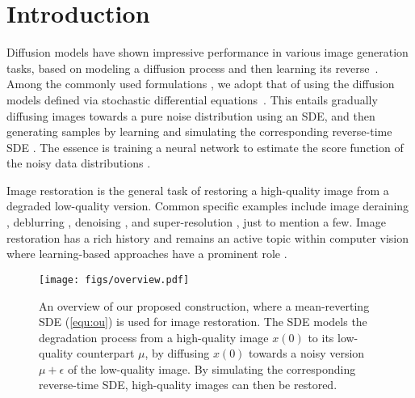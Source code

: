\documentclass{article}
\theoremstyle{plain}
\theoremstyle{definition}
\theoremstyle{remark}
\begin{document}
\section{Introduction}
\label{section:introduction}

Diffusion models have shown impressive performance in various image generation tasks, based on modeling a diffusion process and then learning its reverse~\citep{sohl2015deep, ho2020denoising, song2019generative, song2020improved, song2021denoising, song2021maximum, song2021score, rombach2022high,rissanen2022generative}. Among the commonly used formulations \citep{yang2022diffusion}, we adopt that of using the diffusion models defined via stochastic differential equations~\citep[SDEs,][]{song2021maximum,song2021score}. This entails gradually diffusing images towards a pure noise distribution using an SDE, and then generating samples by learning and simulating the corresponding reverse-time SDE \citep{anderson1982reverse}. The essence is training a neural network to estimate the score function of the noisy data distributions \citep{song2019generative}.

Image restoration is the general task of restoring a high-quality image from a degraded low-quality version. Common specific examples include image deraining \citep{li2019single, ren2019progressive}, deblurring \citep{nah2017deep, zhang2020deblurring}, denoising \citep{zhang2017beyond, zhang2018ffdnet}, and super-resolution \citep{dong2015image, lugmayr2020srflow,luo2022deep}, just to mention a few.
Image restoration has a rich history \citep{hunt1973application, andrews1974digital, sezan1990survey, banham1997digital} and remains an active topic within computer vision where learning-based approaches have a prominent role \citep{zhang2017image, zhang2017learning, wang2022uformer, xiao2022stochastic}. 

\begin{figure*}[t]
    \begin{center}
    \centerline{\texttt{[image: figs/overview.pdf]}}\vspace{-2.0mm}
    \caption{An overview of our proposed construction, where a mean-reverting SDE (\ref{equ:ou}) is used for image restoration. The SDE models the degradation process from a high-quality image $x(0)$ to its low-quality counterpart $\mu$, by diffusing $x(0)$ towards a noisy version $\mu + \epsilon$ of the low-quality image. By simulating the corresponding reverse-time SDE, high-quality images can then be restored.}
    \label{fig:overview}
    \end{center}
    \vskip -0.2in
\end{figure*}
\end{document}
